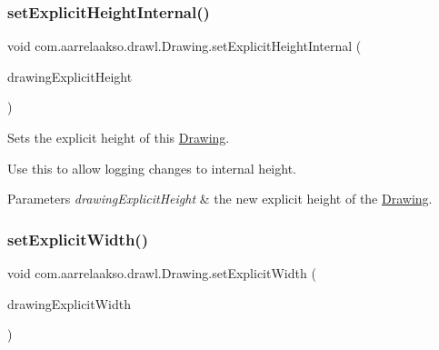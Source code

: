 \subsubsection{\texorpdfstring{set\+Explicit\+Height\+Internal()}{setExplicitHeightInternal()}}
{\footnotesize\ttfamily void com.\+aarrelaakso.\+drawl.\+Drawing.\+set\+Explicit\+Height\+Internal (\begin{DoxyParamCaption}\item[{@Not\+Null final \hyperlink{interfacecom_1_1aarrelaakso_1_1drawl_1_1_number}{Number}}]{drawing\+Explicit\+Height }\end{DoxyParamCaption})\hspace{0.3cm}{\ttfamily [private]}}



Sets the explicit height of this \hyperlink{classcom_1_1aarrelaakso_1_1drawl_1_1_drawing}{Drawing}. 

Use this to allow logging changes to internal height.


\begin{DoxyParams}{Parameters}
{\em drawing\+Explicit\+Height} & the new explicit height of the \hyperlink{classcom_1_1aarrelaakso_1_1drawl_1_1_drawing}{Drawing}. \\
\hline
\end{DoxyParams}
\mbox{\label{classcom_1_1aarrelaakso_1_1drawl_1_1_drawing_a547eda8e04300947a0e424f62589e5c4}} 
\subsubsection{\texorpdfstring{set\+Explicit\+Width()}{setExplicitWidth()}\hspace{0.1cm}{\footnotesize\ttfamily [1/3]}}
{\footnotesize\ttfamily void com.\+aarrelaakso.\+drawl.\+Drawing.\+set\+Explicit\+Width (\begin{DoxyParamCaption}\item[{@Not\+Null final \hyperlink{interfacecom_1_1aarrelaakso_1_1drawl_1_1_number}{Number}}]{drawing\+Explicit\+Width }\end{DoxyParamCaption})\hspace{0.3cm}{\ttfamily [private]}}



